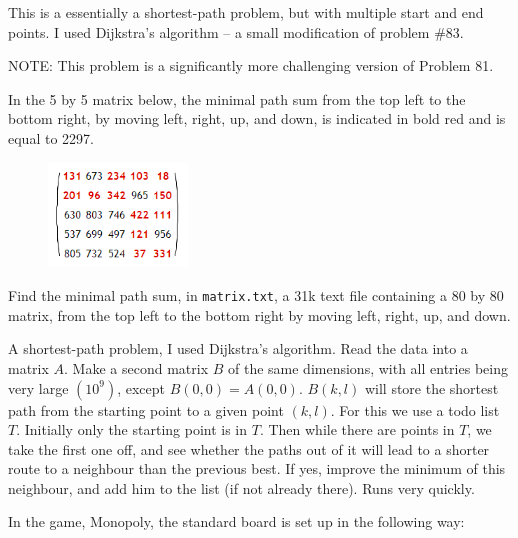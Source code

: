 This is a essentially a shortest-path problem, but with multiple start and end points.  I used Dijkstra's algorithm --  a small modification of problem \#83.




\footnotesize
NOTE: This problem is a significantly more challenging version of Problem 81.

\normalsize
In the 5 by 5 matrix below, the minimal path sum from the top left to the bottom right, by moving left, right, up, and down, is indicated in bold red and is equal to 2297.
\vspace{-0.5cm}
\begin{center}
\begin{figure}[h]
\centering
\includegraphics[width = 0.33\textwidth]{./images/p_083.png}
\end{figure}
\end{center}
\vspace{-1.25cm}
Find the minimal path sum, in \verb"matrix.txt", a 31k text file containing a 80 by 80 matrix, from the top left to the bottom right by moving left, right, up, and down.

A shortest-path problem, I used Dijkstra's algorithm.  Read the data into a matrix $A$.  Make a second matrix $B$ of the same
dimensions, with all entries being very large $(10^9)$, except $B(0,0) = A(0,0)$.  $B(k,l)$ will store the shortest path from the starting point to a given point $(k,l)$.  For this we use a todo list $T$.  Initially only the starting point is in $T$.  Then while there are points in $T$, we take the first one off, and see whether the paths out of it will lead to a shorter route to a neighbour than the previous best.  If yes, improve the minimum of this neighbour, and add him to the list (if not already there).  Runs very quickly.




\footnotesize
In the game, Monopoly, the standard board is set up in the following way:


